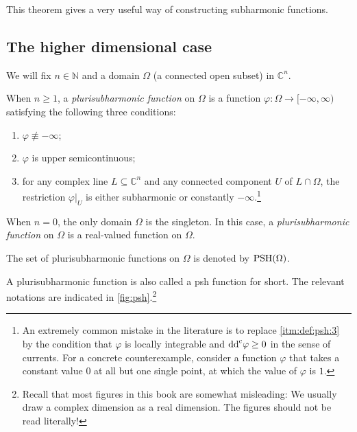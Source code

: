 This theorem gives a very useful way of constructing subharmonic functions.

\subsection{The higher dimensional case}
\label{subsec:psh_hd}
We will fix $n\in \mathbb{N}$ and a domain $\Omega$ (a connected open subset) in $\mathbb{C}^n$.

\begin{definition}\label{def:psh}
    When $n\geq 1$, a \emph{plurisubharmonic function} on $\Omega$ is a function $\varphi\colon \Omega\rightarrow [-\infty,\infty)$ satisfying the following three conditions:
    \begin{enumerate}
        \item\label{itm:def:psh:1} $\varphi\not\equiv -\infty$;
        \item\label{itm:def:psh:2} $\varphi$ is upper semicontinuous;
        \item\label{itm:def:psh:3} for any complex line $L\subseteq \mathbb{C}^n$ and any connected component $U$ of $L\cap \Omega$, the restriction $\varphi|_U$ is either subharmonic or constantly $-\infty$.\footnote{An extremely common mistake in the literature is to replace \ref{itm:def:psh:3} by the condition that $\varphi$ is locally integrable and $\mathrm{dd}^{\mathrm{c}}\varphi\geq 0$ in the sense of currents. For a concrete counterexample, consider a function $\varphi$ that takes a constant value $0$ at all but one single point, at which the value of $\varphi$ is $1$.}
    \end{enumerate}

    When $n=0$, the only domain $\Omega$ is the singleton. In this case, a \emph{plurisubharmonic function} on $\Omega$ is a real-valued function on $\Omega$.

    The set of plurisubharmonic functions on $\Omega$ is denoted by $\PSH(\Omega)$\index{$\PSH(\Omega)$}.
\end{definition}
A plurisubharmonic function is also called a psh function for short. The relevant notations are indicated in \cref{fig:psh}.\footnote{Recall that most figures in this book are somewhat misleading: We usually draw a complex dimension as a real dimension. The figures should not be read literally!}


